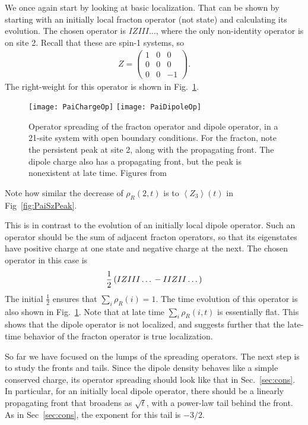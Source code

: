 \documentclass[a4paper,11pt]{article}
\renewcommand{\th}[1]{\frac{1}{#1}}
\newcommand{\ex}[1]{\left\langle #1 \right\rangle}
\newcommand{\note}[1]{{\color{red}{#1}}}
\begin{document}
We once again start by looking at basic localization. That can be shown by starting with an initially local fracton operator (not state) and calculating its evolution. The chosen operator is $IZIII\dots$, where the only non-identity operator is on site 2. Recall that these are spin-1 systems, so 
\begin{align}
Z = \begin{pmatrix} 1 & 0 & 0 \\ 0 & 0 & 0 \\ 0 & 0 & -1 \end{pmatrix}.
\end{align}
The right-weight for this operator is shown in Fig.~\ref{fig:PaiChargeOp}.
\begin{figure}
	\centering
	\texttt{[image: PaiChargeOp]}
	\texttt{[image: PaiDipoleOp]}
	\caption{Operator spreading of the fracton operator and dipole operator, in a 21-site system with open boundary conditions. For the fracton, note the persistent peak at site 2, along with the propagating front. The dipole charge also has a propagating front, but the peak is nonexistent at late time. Figures from~\cite{PaiFracton}}
	\label{fig:PaiChargeOp}
\end{figure}
Note how similar the decrease of $\rho_R(2,t)$ is to $\ex{Z_3}(t)$ in Fig~\ref{fig:PaiSzPeak}.

This is in contrast to the evolution of an initially local dipole operator. Such an operator should be the sum of adjacent fracton operators, so that its eigenstates have positive charge at one state and negative charge at the next. The chosen operator in this case is 
\begin{align}
\th{2}\left(IZIII\dots \vphantom{j}-IIZII\dots\right)
\end{align}
\note{Shouldn't it be $\th{\sqrt{2}}$?} The initial $\th{2}$ ensures that $\sum_i\rho_R(i)=1$. The time evolution of this operator is also shown in Fig.~\ref{fig:PaiChargeOp}. Note that at late time $\sum_i\rho_R(i, t)$ is essentially flat. This shows that the dipole operator is not localized, and suggests further that the late-time behavior of the fracton operator is true localization. 

So far we have focused on the lumps of the spreading operators. The next step is to study the fronts and tails. Since the dipole density behaves like a simple conserved charge, its operator spreading should look like that in Sec.~\ref{sec:cons}. In particular, for an initially local dipole operator, there should be a linearly propagating front that broadens as $\sqrt{t}$, with a power-law tail behind the front. As in Sec~\ref{sec:cons}, the exponent for this tail is $-3/2$.
\end{document}

